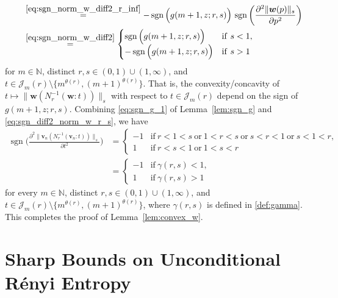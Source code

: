 \documentclass[conference, draftcls, onecolumn]{IEEEtran}
\theoremstyle{plain}
\newcommand{\bvec}[1]{\boldsymbol{#1}}
\newcommand{\sgn}{\operatorname{sgn}}
\newcommand{\lemref}[1]{Lemma~\ref{#1}}
\begin{document}
\begin{IEEEproof}[Proof of \lemref{lem:convex_w}]
\begin{align}
\\
& \qquad \overset{\eqref{eq:sgn_norm_w_diff2_r_inf}}{=}
- \sgn\Big( g(m+1, z; r, s) \Big) \, \sgn\bigg( \frac{ \partial^{2} \| \bvec{w}( p ) \|_{s} }{ \partial p^{2} } \bigg)
\\
& \qquad \overset{\eqref{eq:sgn_norm_w_diff2}}{=}
\begin{cases}
\sgn \Big( g(m+1, z; r, s) \Big)
& \mathrm{if} \ s < 1 ,
\\
- \sgn \Big( g(m+1, z; r, s) \Big)
& \mathrm{if} \ s > 1
\end{cases}
\label{eq:sgn_diff2_norm_w_r_s}
\end{align}
for $m \in \mathbb{N}$, distinct $r, s \in (0, 1) \cup (1, \infty)$, and $t \in \mathcal{J}_{m}( r ) \setminus \{ m^{\theta( r )}, (m+1)^{\theta( r )} \}$.
That is, the convexity/concavity of $t \mapsto \| \bvec{w}( N_{r}^{-1}( \bvec{w} : t ) ) \|_{s}$ with respect to $t \in \mathcal{J}_{m}( r )$ depend on the sign of $g(m+1, z; r, s)$.
Combining \eqref{eq:sgn_g_1} of \lemref{lem:sgn_g} and \eqref{eq:sgn_diff2_norm_w_r_s}, we have
\begin{align}
\sgn \bigg( \frac{ \partial^{2} \| \bvec{v}_{n}( N_{r}^{-1}( \bvec{v}_{n} : t ) ) \|_{s} }{ \partial t^{2} } \bigg)
& =
\begin{cases}
-1
& \mathrm{if} \ r < 1 < s \ \mathrm{or} \ 1 < r < s \ \mathrm{or} \ s < r < 1 \ \mathrm{or} \ s < 1 < r ,
\\
1
& \mathrm{if} \ r < s < 1 \ \mathrm{or} \ 1 < s < r
\end{cases}
\\
& =
\begin{cases}
-1
& \mathrm{if} \ \gamma( r, s ) < 1 ,
\\
1
& \mathrm{if} \ \gamma( r, s ) > 1
\end{cases}
\end{align}
for every $m \in \mathbb{N}$, distinct $r, s \in (0, 1) \cup (1, \infty)$, and $t \in \mathcal{J}_{m}( r ) \setminus \{ m^{\theta( r )}, (m+1)^{\theta( r )} \}$, where $\gamma( r, s )$ is defined in \eqref{def:gamma}.
This completes the proof of \lemref{lem:convex_w}.
\end{IEEEproof}










\section{Sharp Bounds on Unconditional R\'{e}nyi Entropy}
\label{sect:unconditional}
\end{document}

